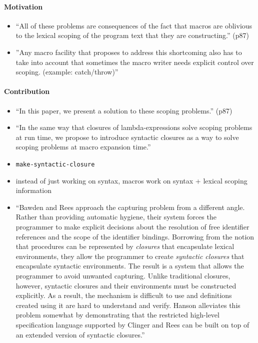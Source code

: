 \documentclass[12pt]{article}	%
\begin{document}
\paragraph{Motivation}
\begin{itemize}
	\item ``All of these problems are consequences of the fact that macros are oblivious to the lexical scoping of the program text that they are constructing.'' (p87)
	\item ''Any macro facility that proposes to address this shortcoming also has to take into account that sometimes the macro writer needs explicit control over scoping. (example: catch/throw)''
\end{itemize}
\paragraph{Contribution}
\begin{itemize}
	\item ``In this paper, we present a solution to these scoping problems.'' (p87)
	\item ``In the same way that closures of lambda-expressions solve scoping problems at run time, we propose to introduce syntactic closures as a way to solve scoping problems at macro expansion time.''
	\item \verb!make-syntactic-closure!
	\item instead of just working on syntax, macros work on syntax + lexical scoping information
	\item ``Bawden and Rees approach the capturing problem from a different angle. Rather than providing automatic hygiene, their system forces the programmer to make explicit decisions about the resolution of free identifier references and the scope of the identifier bindings. Borrowing from the notion that procedures can be represented by \textit{closures} that encapsulate lexical environments, they allow the programmer to create \textit{syntactic closures} that encapsulate syntactic environments. The result is a system that allows the programmer to avoid unwanted capturing. Unlike traditional closures, however, syntactic closures and their environments must be constructed explicitly. As a result, the mechanism is difficult to use and definitions created using it are hard to understand and verify. Hanson alleviates this problem somewhat by demonstrating that the restricted high-level specification language supported by Clinger and Rees can be built on top of an extended version of syntactic closures.''\cite[p298-299]{Dybvig1992Syntactic}
\end{itemize}
\end{document}
